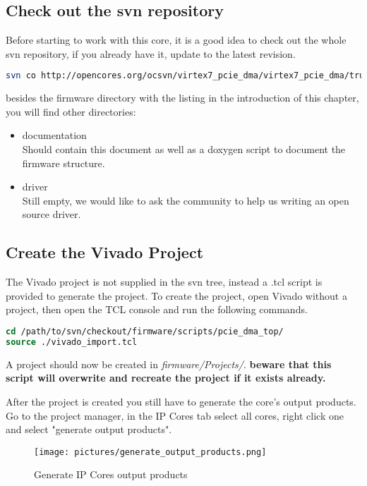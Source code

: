 \subsection{Check out the svn repository}
Before starting to work with this core, it is a good idea to check out the whole svn repository, if you already have it, update to the latest revision.
\begin{lstlisting}[frame=single, language=Bash, caption=svn checkout]
svn co http://opencores.org/ocsvn/virtex7_pcie_dma/virtex7_pcie_dma/trunk 
\end{lstlisting}
besides the firmware directory with the listing in the introduction of this chapter, you will find other directories:\\
\begin{itemize}
\item documentation\\Should contain this document as well as a doxygen script to document the firmware structure.
\item driver\\Still empty, we would like to ask the community to help us writing an open source driver.
\end{itemize}

\subsection{Create the Vivado Project}
The Vivado project is not supplied in the svn tree, instead a .tcl script is provided to generate the project. To create the project, open Vivado without a project, then open the TCL console and run the following commands.
\begin{lstlisting}[frame=single, language=tcl,     caption=Create Vivado Project]
cd /path/to/svn/checkout/firmware/scripts/pcie_dma_top/
source ./vivado_import.tcl
\end{lstlisting}
A project should now be created in \textit{firmware/Projects/}. \textbf{beware that this script will overwrite and recreate the project if it exists already.}

After the project is created you still have to generate the core's output products. Go to the project manager, in the IP Cores tab select all cores, right click one and select "generate output products".
\begin{figure}[H]
\centering
\texttt{[image: pictures/generate\_output\_products.png]}
\caption{Generate IP Cores output products}
\label{fig:generate_output_products}
\end{figure}
